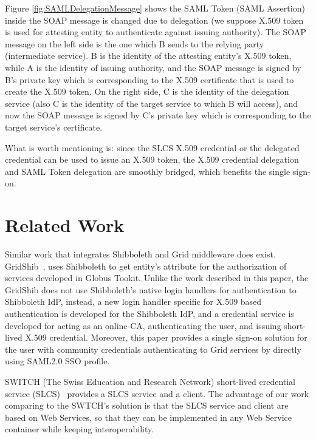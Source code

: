 \documentclass[twocolumn]{svjour3}         %
\begin{document}
Figure \ref{fig:SAMLDelegationMessage} shows the SAML Token (SAML Assertion) inside the SOAP message is changed due to delegation (we suppose X.509 token is used for attesting entity to authenticate against issuing authority). The SOAP message on the left side is the one which B sends to the relying party (intermediate service). B is the identity of the attesting entity’s X.509 token, while A is the identity of issuing authority, and the SOAP message is signed by B’s private key which is corresponding to the X.509 certificate that is used to create the X.509 token. On the right side, C is the identity of the delegation service (also C is the identity of the target service to which B will access), and now the SOAP message is signed by C’s private key which is corresponding to the target service’s certificate.

What is worth mentioning is: since the SLCS X.509 credential or the delegated credential can be used to issue an X.509 token,  the X.509 credential delegation and SAML Token delegation are smoothly bridged, which benefits the single sign-on.



\section{Related Work}
\label{sec:relatedwork}
Similar work that integrates Shibboleth and Grid middleware does exist. GridShib~\cite{VWelch05},\cite{TBarton06} uses Shibboleth to get entity’s attribute for the authorization of services developed in Globus Tookit. Unlike the work described in this paper, the GridShib does not use Shibboleth’s native login handlers for authentication to Shibboleth IdP, instead, a new login handler specific for X.509 based authentication is developed for the Shibboleth IdP, and a credential service is developed for acting as an online-CA, authenticating the user, and issuing short-lived X.509 credential. Moreover, this paper provides a single sign-on solution for the user with community credentials authenticating to Grid services by directly using SAML2.0 SSO profile.

SWITCH (The Swiss Education and Research Network) short-lived credential service (SLCS)~\cite{switchslcslink} provides a SLCS service and a client. The advantage of our work comparing to the SWTCH’s solution is that the SLCS service and client are based on Web Services, so that they can be implemented in any Web Service container while keeping interoperability.
\end{document}
